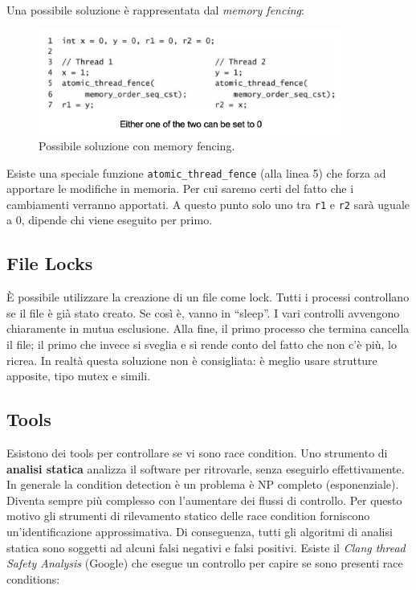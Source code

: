 Una possibile soluzione è rappresentata dal \textit{memory fencing}:

\begin{figure}[H]
    \centering
    \includegraphics[width=10cm, keepaspectratio]{capitoli/secure_coding/img/cap_6/sifance.png}
    \caption{Possibile soluzione con memory fencing.}
\end{figure}

Esiste una speciale funzione \verb|atomic_thread_fence| (alla linea 5) che
forza ad apportare le modifiche in memoria.
Per cui saremo certi del fatto che i cambiamenti verranno apportati.
A questo punto solo uno tra \verb|r1| e \verb|r2| sarà uguale a 0,
dipende chi viene eseguito per primo.


\subsection{File Locks}

È possibile utilizzare la creazione di un file come lock.
Tutti i processi controllano se il file è già stato creato.
Se così è, vanno in “sleep”. I vari controlli avvengono chiaramente in mutua esclusione.
Alla fine, il primo processo che termina cancella il file;
il primo che invece si sveglia e si rende conto del fatto che non c'è più, lo ricrea.
In realtà questa soluzione non è consigliata: è meglio usare strutture apposite, tipo mutex e simili.

\subsection{Tools}

Esistono dei tools per controllare se vi sono race condition.
Uno strumento di \textbf{analisi statica} analizza il software per ritrovarle,
senza eseguirlo effettivamente.
In generale la condition detection è un problema è NP completo (esponenziale).
Diventa sempre più complesso con l'aumentare dei flussi di controllo.
Per questo motivo gli strumenti di rilevamento statico delle race condition forniscono
un'identificazione approssimativa.
Di conseguenza, tutti gli algoritmi di analisi statica sono soggetti ad alcuni falsi
negativi e falsi positivi.
Esiste il \textit{Clang thread Safety Analysis} (Google) che esegue un controllo
per capire se sono presenti race conditions:


